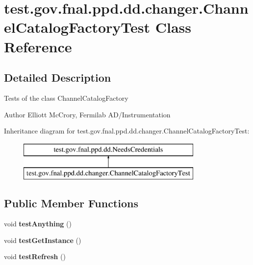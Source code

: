 \hypertarget{classtest_1_1gov_1_1fnal_1_1ppd_1_1dd_1_1changer_1_1ChannelCatalogFactoryTest}{\section{test.\-gov.\-fnal.\-ppd.\-dd.\-changer.\-Channel\-Catalog\-Factory\-Test Class Reference}
\label{classtest_1_1gov_1_1fnal_1_1ppd_1_1dd_1_1changer_1_1ChannelCatalogFactoryTest}
}


\subsection{Detailed Description}
Tests of the class Channel\-Catalog\-Factory

\begin{DoxyAuthor}{Author}
Elliott Mc\-Crory, Fermilab A\-D/\-Instrumentation 
\end{DoxyAuthor}
Inheritance diagram for test.\-gov.\-fnal.\-ppd.\-dd.\-changer.\-Channel\-Catalog\-Factory\-Test\-:\begin{figure}[H]
\begin{center}
\leavevmode
\includegraphics[height=2.000000cm]{classtest_1_1gov_1_1fnal_1_1ppd_1_1dd_1_1changer_1_1ChannelCatalogFactoryTest}
\end{center}
\end{figure}
\subsection*{Public Member Functions}
\begin{DoxyCompactItemize}
\item 
\hypertarget{classtest_1_1gov_1_1fnal_1_1ppd_1_1dd_1_1changer_1_1ChannelCatalogFactoryTest_a6321222c36c1a42a451a4c622191e8ac}{void {\bfseries test\-Anything} ()}\label{classtest_1_1gov_1_1fnal_1_1ppd_1_1dd_1_1changer_1_1ChannelCatalogFactoryTest_a6321222c36c1a42a451a4c622191e8ac}

\item 
\hypertarget{classtest_1_1gov_1_1fnal_1_1ppd_1_1dd_1_1changer_1_1ChannelCatalogFactoryTest_a0f381506eaec142e6ffdd0c4ea09bcba}{void {\bfseries test\-Get\-Instance} ()}\label{classtest_1_1gov_1_1fnal_1_1ppd_1_1dd_1_1changer_1_1ChannelCatalogFactoryTest_a0f381506eaec142e6ffdd0c4ea09bcba}

\item 
\hypertarget{classtest_1_1gov_1_1fnal_1_1ppd_1_1dd_1_1changer_1_1ChannelCatalogFactoryTest_a4874cd96233775a71b46d9ff235ffb7e}{void {\bfseries test\-Refresh} ()}\label{classtest_1_1gov_1_1fnal_1_1ppd_1_1dd_1_1changer_1_1ChannelCatalogFactoryTest_a4874cd96233775a71b46d9ff235ffb7e}

\end{DoxyCompactItemize}

